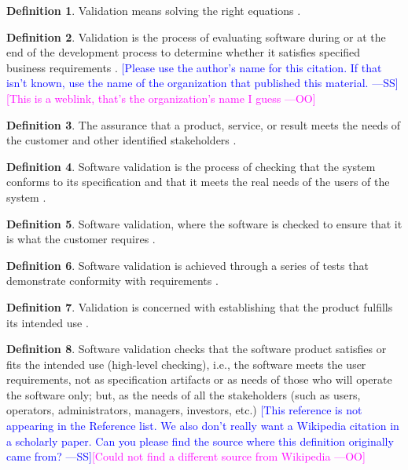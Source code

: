 \documentclass[letterpaper,cleveref]{lipics-v2019}
\newcommand{\authornote}[3]{\textcolor{#1}{[#3 ---#2]}}
\newcommand{\authornote}[3]{}
\newcommand{\wss}[1]{\authornote{blue}{SS}{#1}} %
\newcommand{\oo}[1]{\authornote{magenta}{OO}{#1}} %
\theoremstyle{definition}
\newtheorem{defn}{Definition}
\begin{document}
\begin{defn}
  Validation means solving the right equations \citep[p.~23]{Roache1998}.
\end{defn}

\begin{defn} \label{Validatability_Selected} 
  Validation is the process of evaluating software during or at the end of the
  development process to determine whether it satisfies specified business
  requirements \citep{softwaretestingfundamentals}.  \wss{Please use the
  author's name for this citation.  If that isn't known, use the name of the
  organization that published this material.} \oo{This is a weblink, that's the organization's name I guess}
\end{defn}

\begin{defn}
  The assurance that a product, service, or result meets the needs of the customer and other identified
  stakeholders \citep{project2017guide}.
\end{defn}
\begin{defn}
	Software validation is the process of checking that the system conforms to its specification and
	that it meets the real needs of the users of the system \citep{sommerville}.
	
\end{defn}
\begin{defn}
	Software validation, where the software is checked to ensure that it is what the
	customer requires \citep{sommerville}.
\end{defn}
\begin{defn}
  Software validation is achieved through a series of tests that demonstrate conformity
  with requirements \citep{pressman2005software}.
\end{defn}

\begin{defn}
	Validation is concerned with establishing that the product fulfills its
	intended use \citep{Van vilet}.
\end{defn}

\begin{defn}
  Software validation checks that the software product satisfies or fits the
  intended use (high-level checking), i.e., the software meets the user
  requirements, not as specification artifacts or as needs of those who will
  operate the software only; but, as the needs of all the stakeholders (such as
  users, operators, administrators, managers, investors, etc.)
  \wss{This reference is not appearing in the Reference
  list.  We also don't really want a Wikipedia citation in a scholarly paper.
  Can you please find the source where this definition originally came from?}\oo{Could not find a different source from Wikipedia}
\end{defn}
\end{document}
